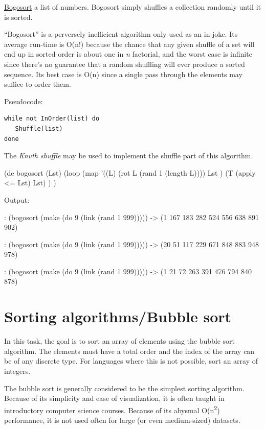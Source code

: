 \href{http://en.wikipedia.org/wiki/Bogosort}{Bogosort} a list of
numbers. Bogosort simply shuffles a collection randomly until it is
sorted.

``Bogosort'' is a perversely inefficient algorithm only used as an
in-joke. Its average run-time is O(n!) because the chance that any given
shuffle of a set will end up in sorted order is about one in \emph{n}
factorial, and the worst case is infinite since there's no guarantee
that a random shuffling will ever produce a sorted sequence. Its best
case is O(n) since a single pass through the elements may suffice to
order them.

Pseudocode:

\begin{verbatim}
while not InOrder(list) do
   Shuffle(list)
done
\end{verbatim}

The \emph{Knuth shuffle} may be used to implement
the shuffle part of this algorithm.

\begin{wideverbatim}

(de bogosort (Lst)
   (loop
      (map
         '((L) (rot L (rand 1 (length L))))
         Lst )
      (T (apply <= Lst) Lst) ) )

Output:

: (bogosort (make (do 9 (link (rand 1 999)))))
-> (1 167 183 282 524 556 638 891 902)

: (bogosort (make (do 9 (link (rand 1 999)))))
-> (20 51 117 229 671 848 883 948 978)

: (bogosort (make (do 9 (link (rand 1 999)))))
-> (1 21 72 263 391 476 794 840 878)

\end{wideverbatim}

\pagebreak{}
\section*{Sorting algorithms/Bubble sort}

In this task, the goal is to sort an array of elements using the bubble
sort algorithm. The elements must have a total order and the index of
the array can be of any discrete type. For languages where this is not
possible, sort an array of integers.

The bubble sort is generally considered to be the simplest sorting
algorithm. Because of its simplicity and ease of visualization, it is
often taught in introductory computer science courses. Because of its
abysmal O(n\textsuperscript{2}) performance, it is not used often for
large (or even medium-sized) datasets.


